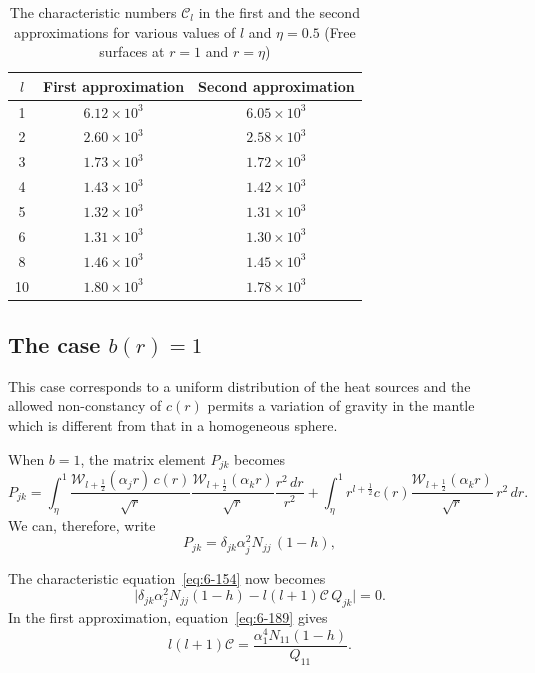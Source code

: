 \begin{table}[ht]
\centering
\caption{The characteristic numbers $\mathcal{C}_l$ in the first and the second approximations
for various values of $l$ and $\eta = 0.5$\newline
(Free surfaces at $r = 1$ and $r = \eta$)}
\label{tab:XXVI}
\begin{tabular}{c c c}
\hline
$l$ & First approximation & Second approximation \\
\hline
1 & $6.12\times 10^3$ & $6.05\times 10^3$ \\
2 & $2.60\times 10^3$ & $2.58\times 10^3$ \\
3 & $1.73\times 10^3$ & $1.72\times 10^3$ \\
4 & $1.43\times 10^3$ & $1.42\times 10^3$ \\
5 & $1.32\times 10^3$ & $1.31\times 10^3$ \\
6 & $1.31\times 10^3$ & $1.30\times 10^3$ \\
8 & $1.46\times 10^3$ & $1.45\times 10^3$ \\
10 & $1.80\times 10^3$ & $1.78\times 10^3$ \\
\hline
\end{tabular}
\end{table}

\subsection{The case $b(r) = 1$}\label{sec:60b}
This case corresponds to a uniform distribution of the heat sources
and the allowed non-constancy of $c(r)$ permits a variation of gravity
in the mantle which is different from that in a homogeneous sphere.

When $b = 1$, the matrix element $P_{jk}$ becomes
\begin{equation}\label{eq:6-187}
P_{jk} = \int_\eta^1 \frac{\mathscr{W}_{l+\frac{1}{2}}(\alpha_j r)\,c(r)}{\sqrt{r}}\frac{\mathscr{W}_{l+\frac{1}{2}}(\alpha_k r)}{\sqrt{r}}\frac{r^2\,dr}{r^2}
+ \int_\eta^1 r^{l+\frac{1}{2}}c(r)\frac{\mathscr{W}_{l+\frac{1}{2}}(\alpha_k r)}{\sqrt{r}}\,r^2\,dr.
\end{equation}
We can, therefore, write
\begin{equation}\label{eq:6-188}
P_{jk} = \delta_{jk}\alpha_j^2 N_{jj}\,(1-h),
\end{equation}

The characteristic equation~\eqref{eq:6-154} now becomes
\begin{equation}\label{eq:6-189}
\bigl|\delta_{jk}\alpha_j^2 N_{jj}(1-h) - l(l+1)\mathcal{C}\,Q_{jk}\bigr| = 0.
\end{equation}
In the first approximation, equation~\eqref{eq:6-189} gives
\begin{equation}\label{eq:6-190}
l(l+1)\mathcal{C} = \frac{\alpha_1^4 N_{11}(1-h)}{Q_{11}}.
\end{equation}

